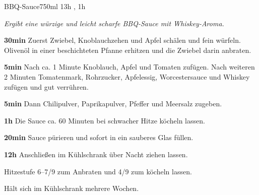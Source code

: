 \documentclass[../recipe-collections/cooking.tex]{subfiles}
\begin{document}
\begin{recipe}{BBQ-Sauce}{750ml }{13h , 1h }

  \freeform{}\textit{Ergibt eine würzige und leicht scharfe BBQ-Sauce mit Whiskey-Aroma.}


  \textbf{30min}
  Zuerst Zwiebel, Knoblauchzehen und Apfel schälen und fein würfeln.
  Olivenöl in einer beschichteten Pfanne erhitzen und die Zwiebel darin anbraten.


  \textbf{5min}
  Nach ca. 1 Minute Knoblauch, Apfel und Tomaten zufügen.
  Nach weiteren 2 Minuten Tomatenmark, Rohrzucker, Apfelessig, Worcestersauce und Whiskey zufügen und gut verrühren.


  \textbf{5min}
  Dann Chilipulver, Paprikapulver, Pfeffer und Meersalz zugeben.

  \newstep{}\textbf{1h}
  Die Sauce ca. 60 Minuten bei schwacher Hitze köcheln lassen.

  \newstep{}\textbf{20min}
  Sauce pürieren und sofort in ein sauberes Glas füllen.

  \newstep{}\textbf{12h}
  Anschließen im Kühlschrank über Nacht ziehen lassen.

  \freeform{}\hrulefill{}

  \freeform{}
  Hitzestufe 6–7/9 zum Anbraten und 4/9 zum köcheln lassen.

  \freeform{}
  Hält sich im Kühlschrank mehrere Wochen.

\end{recipe}
\end{document}
